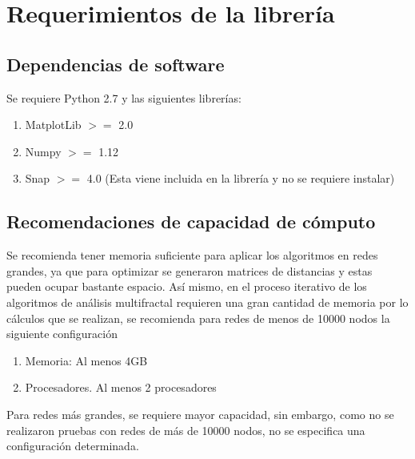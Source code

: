 \section{Requerimientos de la librería}


\subsection{Dependencias de software}

Se requiere Python 2.7 y las siguientes librerías:

\begin{enumerate}
    \item MatplotLib $>=$ 2.0
    \item Numpy $>=$ 1.12
    \item Snap $>=$ 4.0 (Esta viene incluida en la librería y no se requiere instalar)
\end{enumerate}

\subsection{Recomendaciones de capacidad de cómputo}

Se recomienda tener memoria suficiente para aplicar los algoritmos en redes grandes, ya que para optimizar se generaron matrices de distancias y estas pueden ocupar bastante espacio. Así mismo, en el proceso iterativo de los algoritmos de análisis multifractal requieren una gran cantidad de memoria por lo cálculos que se realizan, se recomienda para redes de menos de 10000 nodos la siguiente configuración

\begin{enumerate}
    \item Memoria: Al menos 4GB
    \item Procesadores. Al menos 2 procesadores
\end{enumerate}

Para redes más grandes, se requiere mayor capacidad, sin embargo, como no se realizaron pruebas con redes de más de 10000 nodos, no se especifica una configuración determinada.